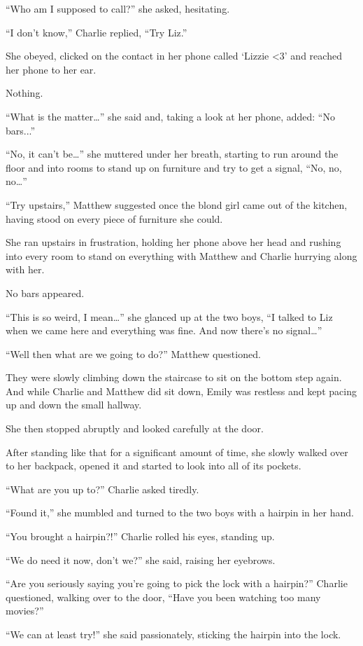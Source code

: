 “Who am I supposed to call?” she asked, hesitating.

“I don't know,” Charlie replied, “Try Liz.”

She obeyed, clicked on the contact in her phone called ‘Lizzie <3' and reached her phone to her ear.

Nothing.

“What is the matter…” she said and, taking a look at her phone, added: “No bars...”

“No, it can't be…” she muttered under her breath, starting to run around the floor and into rooms to stand up on furniture and try to get a signal, “No, no, no…”

“Try upstairs,” Matthew suggested once the blond girl came out of the kitchen, having stood on every piece of furniture she could.

She ran upstairs in frustration, holding her phone above her head and rushing into every room to stand on everything with Matthew and Charlie hurrying along with her.

No bars appeared.

“This is so weird, I mean…” she glanced up at the two boys, “I talked to Liz when we came here and everything was fine. And now there's no signal…”

“Well then what are we going to do?” Matthew questioned.

They were slowly climbing down the staircase to sit on the bottom step again. And while Charlie and Matthew did sit down, Emily was restless and kept pacing up and down the small hallway.

She then stopped abruptly and looked carefully at the door.

After standing like that for a significant amount of time, she slowly walked over to her backpack, opened it and started to look into all of its pockets.

“What are you up to?” Charlie asked tiredly.

“Found it,” she mumbled and turned to the two boys with a hairpin in her hand.

“You brought a hairpin?!” Charlie rolled his eyes, standing up.

“We do need it now, don't we?” she said, raising her eyebrows.

“Are you seriously saying you're going to pick the lock with a hairpin?” Charlie questioned, walking over to the door, “Have you been watching too many movies?”

“We can at least try!” she said passionately, sticking the hairpin into the lock.


